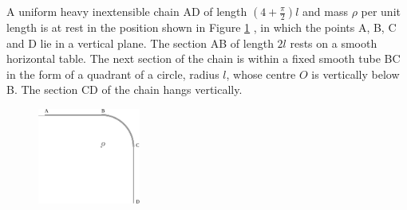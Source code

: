 
\begin{problem}
{A uniform heavy inextensible chain AD of length $\left( 4 + \frac{\pi}{2} \right)l$ and mass $\rho$ per unit length is at rest in the position shown in Figure \ref{fig:Dynamics_chain_sliding} , in which the points A, B, C and D lie in a vertical plane. The section AB of length $2l$ rests on a smooth horizontal table. The next section of the chain is within a fixed smooth tube BC in the form of a quadrant of a circle, radius $l$, whose centre $O$ is vertically below B. The section CD of the chain hangs vertically.

\begin{figure}[h!]
\centering
\includegraphics[width=0.3\textwidth]{../../../figures/Dynamics_chain_sliding.svg}
\caption{}
\label{fig:Dynamics_chain_sliding}
\end{figure}

}
\end{problem}
